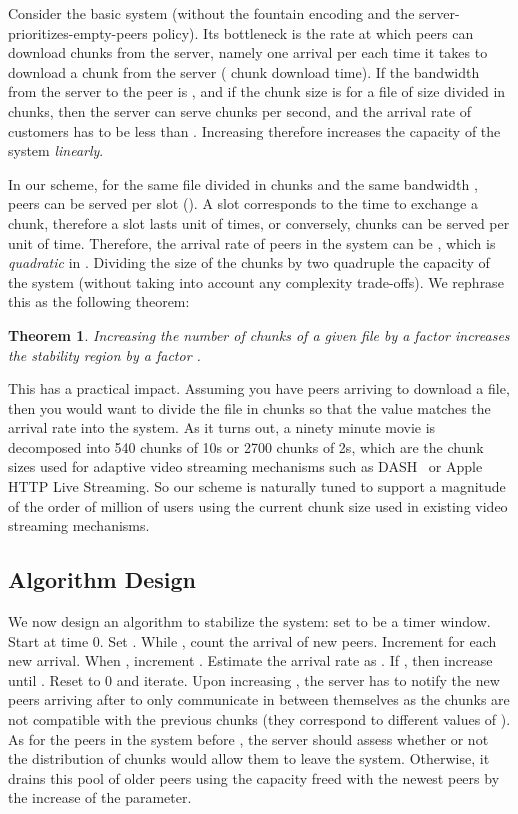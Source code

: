 \documentclass[11pt,conference]{IEEEtran}
\newtheorem{theorem}{Theorem}[section]
\newcommand{\bTheorem}{ \begin{theorem}  }
\newcommand{\eTheorem}{ \end{theorem}    }
\begin{document}
Consider the basic system (without the fountain encoding and the server-prioritizes-empty-peers policy). Its bottleneck is the rate at which peers can download chunks from the server, namely one arrival per each time it takes to download a chunk from the server ( chunk download time). If the bandwidth from the server to the peer is , and if the chunk size is  for a file of size  divided in  chunks, then the server can serve  chunks per second, and the arrival rate of customers has to be less than . Increasing  therefore increases the capacity of the system {\em linearly}.

In our scheme, for the same file  divided in  chunks and the same bandwidth ,  peers can be served per slot (). A slot corresponds to the time to exchange a chunk, therefore a slot lasts  unit of times, or conversely,  chunks can be served per unit of time. Therefore, the arrival rate of peers in the system can be , which is {\em quadratic} in . Dividing the size of the chunks by two quadruple the capacity of the system (without taking into account any complexity trade-offs). We rephrase this as the following theorem:

\bTheorem Increasing the number of chunks of a given file by a factor  increases the stability region by a factor .
\eTheorem

This has a practical impact. Assuming you have  peers arriving to download a file, then you would want to divide the file in  chunks so that the value  matches the arrival rate into the system. As it turns out, a ninety minute movie is decomposed into 540 chunks of 10s or 2700 chunks of 2s, which are the chunk sizes used for adaptive video streaming mechanisms such as DASH~\cite{Stoekhammer2011,grandl2013,Lederer2012} or Apple HTTP Live Streaming. So our scheme is naturally tuned to support a magnitude of the order of million of users using the current chunk size used in existing video streaming mechanisms.

\subsection{Algorithm Design}

We now design an algorithm to stabilize the system: set  to be a timer window. Start at time 0. Set . While , count the arrival of new peers. Increment  for each new arrival. When , increment . Estimate the arrival rate as . If , then increase  until . Reset  to 0 and iterate. Upon increasing , the server has to notify the new peers arriving after  to only communicate in between themselves as the chunks are not compatible with the previous chunks (they correspond to different values of ). As for the peers in the system before , the server should assess whether or not the distribution of chunks would allow them to leave the system. Otherwise, it drains this pool of older peers using the capacity freed with the newest peers by the increase of the  parameter.
\end{document}
